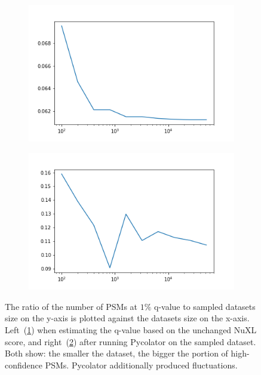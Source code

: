 \begin{figure}
	\normalsize
	\centering
	\begin{subfigure}{0.49 \textwidth}
		\includegraphics[width = \textwidth]{figures/ratio_idents_whole_df_NuXL.png}
		\caption{}
		\label{fig:results:small_dataset_first_ratio_dxl}
	\end{subfigure}
	\hfill
	\begin{subfigure}{0.49 \textwidth}
		\includegraphics[width = \textwidth]{figures/ratio_idents_whole_df_percolator.png}
		\caption{}
		\label{fig:results:small_dataset_first_auc_ratio_pxl}
	\end{subfigure}
	\caption[]{The ratio of the number of PSMs at $1\%$ q-value to sampled datasets size on the y-axis is plotted against the datasets size on the x-axis. Left~(\ref{fig:results:small_dataset_first_ratio_dxl}) when estimating the q-value based on the unchanged NuXL score, and right~(\ref{fig:results:small_dataset_first_auc_ratio_pxl}) after running Pycolator on the sampled dataset. Both show: the smaller the dataset, the bigger the portion of high-confidence PSMs. Pycolator additionally produced fluctuations.}
	\label{fig:results:small_dataset_first_auc_ratio}
\end{figure}
